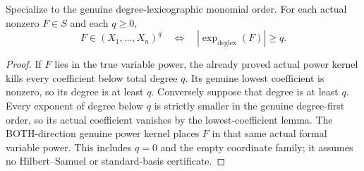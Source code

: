 \begin{lemma}
\label{hir:actual-formal-degreelex-initial-exponent-power-kernel}
Specialize to the genuine degree-lexicographic monomial order. For each
actual nonzero $F\in S$ and each $q\ge0$,
\[
 F\in(X_1,\ldots,X_n)^q\quad\Longleftrightarrow\quad
 |\exp_{\mathrm{deglex}}(F)|\ge q.
\]
\leanok
\end{lemma}
\begin{proof}
If $F$ lies in the true variable power, the already proved actual power
kernel kills every coefficient below total degree $q$. Its genuine
lowest coefficient is nonzero, so its degree is at least $q$.
Conversely suppose that degree is at least $q$. Every exponent of
degree below $q$ is strictly smaller in the genuine degree-first order,
so its actual coefficient vanishes by the lowest-coefficient lemma.
The BOTH-direction genuine power kernel places $F$ in that same actual
formal variable power. This includes $q=0$ and the empty coordinate
family; it assumes no Hilbert--Samuel or standard-basis certificate.
\end{proof}
